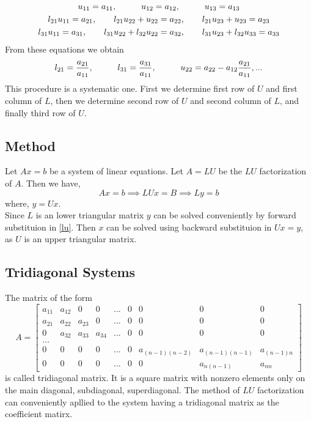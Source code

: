 \documentclass[aima203_lecturenotes_ku.tex]{subfiles}
\begin{document}
\begin{gather*}
  u_{11} = a_{11}, \hspace{10mm} u_{12}=a_{12}, \hspace{10mm} u_{13}=a_{13} \\
  l_{21}u_{11} = a_{21}, \hspace{7mm} l_{21}u_{22} + u_{22} =a_{22}, \hspace{7mm} l_{21}u_{23} + u_{23}=a_{23} \\
  l_{31}u_{11} = a_{31}, \hspace{7mm} l_{31}u_{22}+ l_{32}u_{22}=a_{32}, \hspace{7mm} l_{31}u_{23}+ l_{32}u_{33}=a_{33}
\end{gather*}
From these equations we obtain
\begin{equation}
  \begin{gathered}
    l_{21} = \frac{a_{21}}{a_{11}},\hspace{10mm} l_{31} = \frac{a_{31}}{a_{11}}, \hspace{1cm}  u_{22} = a_{22} - a_{12}\frac{a_{21}}{a_{11}}, ...
  \end{gathered}
\end{equation}
This procedure is a systematic one. First we determine first row of $U$ and first column of $L$, then we determine second row of $U$ and second column of $L$, and finally third row of $U$.

\subsection{Method}
Let $Ax=b$ be a system of linear equations. Let $A=LU$ be the $LU$ factorization of $A$. Then we have,
\begin{equation}
  \label{lu}
  Ax=b \implies LUx=B \implies Ly=b
\end{equation}
where, $y=Ux$. \\
Since $L$ is an lower triangular matrix $y$ can be solved conveniently by forward substituion in \ref{lu}. Then $x$ can be solved using backward substituion in $Ux=y$, as $U$ is an upper triangular matrix.

\subsection{Tridiagonal Systems}
The matrix of the form $$A= \begin{bmatrix}
    a_{11} & a_{12} & 0 & 0 &... & 0 & 0 & 0 & 0\\
    a_{21} & a_{22} & a_{23} & 0 &... & 0 &0 &0 & 0\\
    0 & a_{32} & a_{33} & a_{34} &... & 0 & 0 &0 & 0\\
    ...\\
    0 & 0 & 0 & 0 &...& 0 & a_{(n-1)(n-2)} & a_{(n-1)(n-1)} & a_{(n-1)n} \\
    0 & 0 & 0 & 0&... & 0 & 0 & a_{n(n-1)} & a_{nn}
\end{bmatrix}$$ is called tridiagonal matrix. It is a square matrix with nonzero elements only on the main diagonal, subdiagonal, superdiagonal.
The method of $LU$ factorization can conveniently apllied to the system having a tridiagonal matrix as the coefficient matirx.
\end{document}
